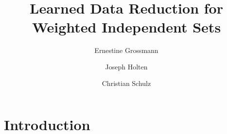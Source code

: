 \documentclass[a4paper,UKenglish,cleveref, autoref, thm-restate,nolipics]{lipics-v2019}
\title{Learned Data Reduction for Weighted Independent Sets} %
\author{Ernestine Grossmann}{Heidelberg University, Heidelberg, Germany}{e.grossmann@informatik.uni-heidelberg.de}{https://orcid.org/0000-0000-0000-0000}{}
\author{Joseph Holten}{Heidelberg University, Heidelberg, Germany}{joseph.holten@stud.uni-heidelberg.de}{https://orcid.org/0000-0003-2853-1439}{}
\author{Christian Schulz}{Heidelberg University, Heidelberg, Germany}{christian.schulz@informatik.uni-heidelberg.de}{https://orcid.org/0000-0002-2823-3506}{}
\begin{document}
\maketitle

\begin{abstract}
\end{abstract}

\section{Introduction}
\label{sec:intro}
\end{document}
